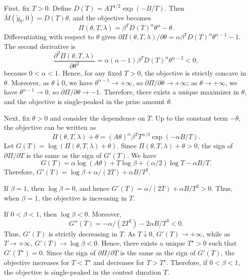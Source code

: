 \documentclass[mnsc]{informs3}
\begin{document}
\begin{APPENDICES}
First, fix $T>0$. Define $D(T)=A T^{1/2}\exp(-B/T)$. Then $\bar M(\tilde y_0,0)=D(T)\theta$, and the objective becomes
\begin{equation*}
\Pi(\theta,T,\lambda)
=
\beta^T D(T)^\alpha \theta^\alpha
-
\theta.
\end{equation*}
Differentiating with respect to $\theta$ gives $\partial \Pi(\theta,T,\lambda)/\partial \theta=\alpha\beta^T D(T)^\alpha \theta^{\alpha-1}-1$. The second derivative is
\begin{equation*}
\frac{\partial^2 \Pi(\theta,T,\lambda)}{\partial \theta^2}
=
\alpha(\alpha-1)\beta^T D(T)^\alpha \theta^{\alpha-2}
<
0,
\end{equation*}
because $0<\alpha<1$. Hence, for any fixed $T>0$, the objective is strictly concave in $\theta$. Moreover, as $\theta\downarrow 0$, we have $\theta^{\alpha-1}\to+\infty$, so $\partial \Pi/\partial \theta\to+\infty$; as $\theta\to+\infty$, we have $\theta^{\alpha-1}\to 0$, so $\partial \Pi/\partial \theta\to -1$. Therefore, there exists a unique maximizer in $\theta$, and the objective is single-peaked in the prize amount $\theta$.

Next, fix $\theta>0$ and consider the dependence on $T$. Up to the constant term $-\theta$, the objective can be written as
\begin{equation*}
\Pi(\theta,T,\lambda)+\theta
=
(A\theta)^\alpha
\beta^T
T^{\alpha/2}
\exp(-\alpha B/T).
\end{equation*}
Let $G(T)=\log(\Pi(\theta,T,\lambda)+\theta)$. Since $\Pi(\theta,T,\lambda)+\theta>0$, the sign of $\partial \Pi/\partial T$ is the same as the sign of $G'(T)$. We have
\begin{equation*}
G(T)
=
\alpha\log(A\theta)
+
T\log\beta
+
(\alpha/2)\log T
-
\alpha B/T.
\end{equation*}
Therefore, $G'(T)=\log\beta+\alpha/(2T)+\alpha B/T^2$.

If $\beta=1$, then $\log\beta=0$, and hence $G'(T)=\alpha/(2T)+\alpha B/T^2>0$. Thus, when $\beta=1$, the objective is increasing in $T$.

If $0<\beta<1$, then $\log\beta<0$. Moreover,
\begin{equation*}
G''(T)
=
-\alpha/(2T^2)-2\alpha B/T^3
<
0.
\end{equation*}
Thus, $G'(T)$ is strictly decreasing in $T$. As $T\downarrow 0$, $G'(T)\to+\infty$, while as $T\to+\infty$, $G'(T)\to\log\beta<0$. Hence, there exists a unique $T^\star>0$ such that $G'(T^\star)=0$. Since the sign of $\partial \Pi/\partial T$ is the same as the sign of $G'(T)$, the objective increases for $T<T^\star$ and decreases for $T>T^\star$. Therefore, if $0<\beta<1$, the objective is single-peaked in the contest duration $T$.


\end{APPENDICES}
\end{document}
